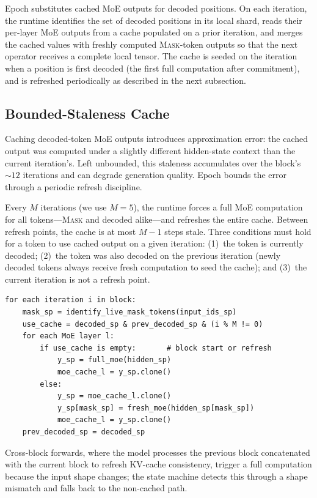\documentclass[sigconf,review,anonymous, 10pt]{acmart}
\newcommand{\sys}{Epoch}
\newcommand{\mask}{\textsc{Mask}}
\begin{document}
\sys{} substitutes cached MoE outputs for decoded positions.
On each iteration, the runtime identifies the set of decoded positions in its local shard, reads their per-layer MoE outputs from a cache populated on a prior iteration, and merges the cached values with freshly computed \mask{}-token outputs so that the next operator receives a complete local tensor.
The cache is seeded on the iteration when a position is first decoded (the first full computation after commitment), and is refreshed periodically as described in the next subsection.

\subsection{Bounded-Staleness Cache}
\label{sec:staleness}

Caching decoded-token MoE outputs introduces approximation error: the cached output was computed under a slightly different hidden-state context than the current iteration's.
Left unbounded, this staleness accumulates over the block's ${\sim}12$ iterations and can degrade generation quality.
\sys{} bounds the error through a periodic refresh discipline.

Every $M$ iterations (we use $M{=}5$), the runtime forces a full MoE computation for all tokens---\mask{} and decoded alike---and refreshes the entire cache.
Between refresh points, the cache is at most $M{-}1$ steps stale.
Three conditions must hold for a token to use cached output on a given iteration: (1)~the token is currently decoded; (2)~the token was also decoded on the previous iteration (newly decoded tokens always receive fresh computation to seed the cache); and (3)~the current iteration is not a refresh point.

\begin{lstlisting}[caption={Decoded-token skip with bounded-staleness cache.},label={lst:cache-merge}]
for each iteration i in block:
    mask_sp = identify_live_mask_tokens(input_ids_sp)
    use_cache = decoded_sp & prev_decoded_sp & (i % M != 0)
    for each MoE layer l:
        if use_cache is empty:       # block start or refresh
            y_sp = full_moe(hidden_sp)
            moe_cache_l = y_sp.clone()
        else:
            y_sp = moe_cache_l.clone()
            y_sp[mask_sp] = fresh_moe(hidden_sp[mask_sp])
            moe_cache_l = y_sp.clone()
    prev_decoded_sp = decoded_sp
\end{lstlisting}

Cross-block forwards, where the model processes the previous block concatenated with the current block to refresh KV-cache consistency, trigger a full computation because the input shape changes; the state machine detects this through a shape mismatch and falls back to the non-cached path.
\end{document}

